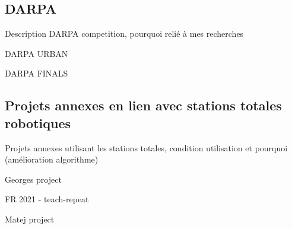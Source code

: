 \subsection{DARPA}

Description DARPA competition, pourquoi relié à mes recherches

DARPA URBAN

DARPA FINALS

\subsection{Projets annexes en lien avec stations totales robotiques}

Projets annexes utilisant les stations totales, condition utilisation et pourquoi (amélioration algorithme)

Georges project

FR 2021 - teach-repeat

Matej project